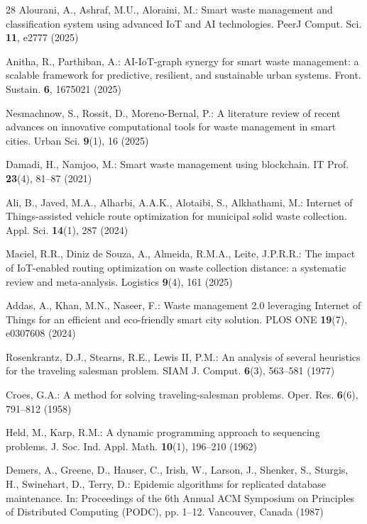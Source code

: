 \documentclass{llncs}
\begin{document}
\begin{thebibliography}{28}
Alourani, A., Ashraf, M.U., Aloraini, M.: Smart waste management and
classification system using advanced IoT and AI technologies. PeerJ Comput.
Sci. \textbf{11}, e2777 (2025)

Anitha, R., Parthiban, A.: AI-IoT-graph synergy for smart waste management: a
scalable framework for predictive, resilient, and sustainable urban systems.
Front. Sustain. \textbf{6}, 1675021 (2025)

Nesmachnow, S., Rossit, D., Moreno-Bernal, P.: A literature review of recent
advances on innovative computational tools for waste management in smart
cities. Urban Sci. \textbf{9}(1), 16 (2025)

Damadi, H., Namjoo, M.: Smart waste management using blockchain. IT Prof.
\textbf{23}(4), 81--87 (2021)

Ali, B., Javed, M.A., Alharbi, A.A.K., Alotaibi, S., Alkhathami, M.: Internet
of Things-assisted vehicle route optimization for municipal solid waste
collection. Appl. Sci. \textbf{14}(1), 287 (2024)

Maciel, R.R., Diniz de Souza, A., Almeida, R.M.A., Leite, J.P.R.R.: The
impact of IoT-enabled routing optimization on waste collection distance: a
systematic review and meta-analysis. Logistics \textbf{9}(4), 161 (2025)

Addas, A., Khan, M.N., Naseer, F.: Waste management 2.0 leveraging Internet
of Things for an efficient and eco-friendly smart city solution. PLOS ONE
\textbf{19}(7), e0307608 (2024)

Rosenkrantz, D.J., Stearns, R.E., Lewis II, P.M.: An analysis of several
heuristics for the traveling salesman problem. SIAM J. Comput. \textbf{6}(3),
563--581 (1977)

Croes, G.A.: A method for solving traveling-salesman problems. Oper. Res.
\textbf{6}(6), 791--812 (1958)

Held, M., Karp, R.M.: A dynamic programming approach to sequencing problems.
J. Soc. Ind. Appl. Math. \textbf{10}(1), 196--210 (1962)

Demers, A., Greene, D., Hauser, C., Irish, W., Larson, J., Shenker, S.,
Sturgis, H., Swinehart, D., Terry, D.: Epidemic algorithms for replicated
database maintenance. In: Proceedings of the 6th Annual ACM Symposium on
Principles of Distributed Computing (PODC), pp. 1--12. Vancouver, Canada (1987)


\end{thebibliography}
\end{document}
